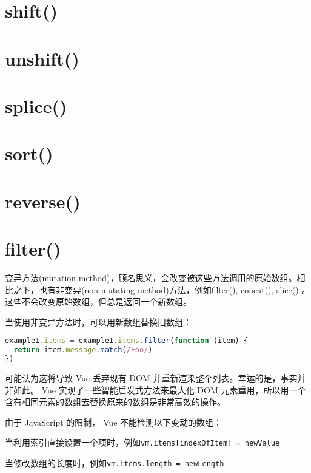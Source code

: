 \section{shift()}


\section{unshift()}

\section{splice()}

\section{sort()}

\section{reverse()}

\section{filter()}

变异方法(mutation method)，顾名思义，会改变被这些方法调用的原始数组。相比之下，也有非变异(non-mutating method)方法，例如filter(), concat(), slice() 。这些不会改变原始数组，但总是返回一个新数组。

当使用非变异方法时，可以用新数组替换旧数组：


\begin{lstlisting}[language=JavaScript]
example1.items = example1.items.filter(function (item) {
  return item.message.match(/Foo/)
})
\end{lstlisting}

可能认为这将导致 Vue 丢弃现有 DOM 并重新渲染整个列表。幸运的是，事实并非如此。 Vue 实现了一些智能启发式方法来最大化 DOM 元素重用，所以用一个含有相同元素的数组去替换原来的数组是非常高效的操作。


由于 JavaScript 的限制， Vue 不能检测以下变动的数组：

\begin{compactenum}
\item 当利用索引直接设置一个项时，例如\texttt{vm.items[indexOfItem] = newValue}
\item 当修改数组的长度时，例如\texttt{vm.items.length = newLength}
\end{compactenum}


